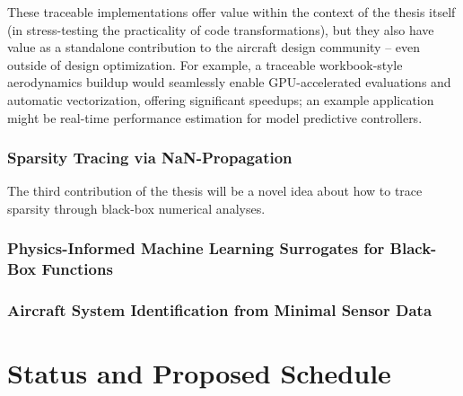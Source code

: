 \documentclass[12pt,vi,oneside]{report}
\begin{document}
    These traceable implementations offer value within the context of the thesis itself (in stress-testing the practicality of code transformations), but they also have value as a standalone contribution to the aircraft design community -- even outside of design optimization. For example, a traceable workbook-style aerodynamics buildup would seamlessly enable GPU-accelerated evaluations and automatic vectorization, offering significant speedups; an example application might be real-time performance estimation for model predictive controllers.

    \subsection{Sparsity Tracing via NaN-Propagation}

    The third contribution of the thesis will be a novel idea about how to trace sparsity through black-box numerical analyses.

    \subsection{Physics-Informed Machine Learning Surrogates for Black-Box Functions}

%

    \subsection{Aircraft System Identification from Minimal Sensor Data}


    \chapter{Status and Proposed Schedule}
    \label{sec:status}
\end{document}
